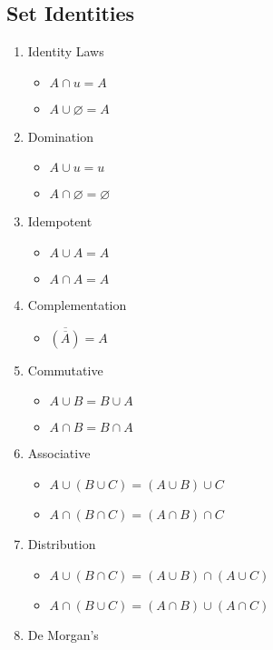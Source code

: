 \documentclass[letterpaper, 12pt]{math}
\begin{document}
\subsection*{Set Identities}
\begin{enumerate}
  \item Identity Laws
  \begin{itemize}
    \item \( A \cap u = A \)
    \item \( A \cup \varnothing = A \)
  \end{itemize}
  \item Domination
  \begin{itemize}
    \item \( A \cup u = u \)
    \item \( A \cap \varnothing = \varnothing \)
  \end{itemize}
  \item Idempotent
  \begin{itemize}
    \item \( A \cup A = A \)
    \item \( A \cap A = A \)
  \end{itemize}
  \item Complementation
  \begin{itemize}
    \item \( \overline{(\overline{A})} = A \)
  \end{itemize}
  \item Commutative
  \begin{itemize}
    \item \( A \cup B = B \cup A \)
    \item \( A \cap B = B \cap A \)
  \end{itemize}
  \item Associative
  \begin{itemize}
    \item \( A \cup (B \cup C) = (A \cup B) \cup C \)
    \item \( A \cap (B \cap C) = (A \cap B) \cap C \)
  \end{itemize}
  \item Distribution
  \begin{itemize}
    \item \( A \cup (B \cap C) = (A \cup B) \cap (A \cup C) \)
    \item \( A \cap (B \cup C) = (A \cap B) \cup (A \cap C) \)
  \end{itemize}
  \item De Morgan's

\end{enumerate}
\end{document}

